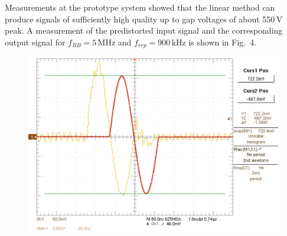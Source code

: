 \documentclass[a4paper,
              ]{jacow}
\begin{document}
	Measurements at the prototype system showed that the linear method can	produce signals of sufficiently high quality up to gap voltages of about 550\,V peak. A measurement of the predistorted input signal and 
	the corresponding output signal for \mbox{$f_{BB}=5\,\text{MHz}$} and \mbox{$f_{rep}=900\,\text{kHz}$} is shown in Fig.~4. 
			
	\begin{figure}[!h]
	\vspace{-0.5\baselineskip}
	\begin{center}
	 \includegraphics[scale=0.42]{WEPVA047f4.eps}
	  \label{Signal}
	\end{center}
	\vspace{-\baselineskip}
	\end{figure}
	
	
\end{document}
